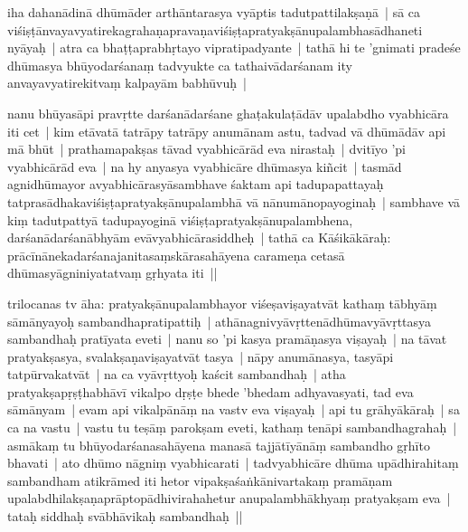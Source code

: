 \documentclass[article,12pt,a4paper]{memoir}%
\newcommand{\persName}[1]{#1}
\newcounter{parCount}
\begin{document}
	  \pstart \leavevmode%
	\label{thakur75-106.4}iha dahanādinā dhūmāder arthāntarasya vyāptis tadutpattilakṣaṇā | sā ca viśiṣṭānvayavyatirekagrahaṇapravaṇaviśiṣṭapratyakṣānupalambhasādhaneti nyāyaḥ | atra ca bhaṭṭaprabhṛtayo vipratipadyante | tathā hi te 'gnimati pradeśe dhūmasya bhūyodarśanaṃ tadvyukte ca tathaivādarśanam ity anvayavyatirekitvaṃ kalpayām babhūvuḥ | 
	{}
	\pend%
      

	  \pstart \leavevmode%
	\label{thakur75-106.8}nanu bhūyasāpi pravṛtte darśanādarśane ghaṭakulaṭādāv upalabdho vyabhicāra iti cet | kim etāvatā tatrāpy tatrāpy anumānam astu, tadvad vā dhūmādāv api mā bhūt | prathamapakṣas tāvad vyabhicārād eva nirastaḥ | dvitīyo 'pi vyabhicārād eva | na hy anyasya vyabhicāre dhūmasya kiñcit | tasmād agnidhūmayor avyabhicārasyāsambhave śaktam api tadupapattayaḥ tatprasādhakaviśiṣṭapratyakṣānupalambhā vā nānumānopayoginaḥ | sambhave vā kiṃ tadutpattyā tadupayoginā viśiṣṭapratyakṣānupalambhena, darśanādarśanābhyām evāvyabhicārasiddheḥ | tathā ca Kāśikākāraḥ: prācīnānekadarśanajanitasaṃskārasahāyena carameṇa cetasā dhūmasyāgniniyatatvaṃ gṛhyata iti ||
	{}
	\pend%
      

	  \pstart \leavevmode%
	\label{thakur75-106.16}\persName{trilocanas} tv āha: pratyakṣānupalambhayor viśeṣaviṣayatvāt kathaṃ tābhyāṃ sāmānyayoḥ sambandhapratipattiḥ | athānagnivyāvṛttenādhūmavyāvṛttasya sambandhaḥ pratīyata eveti | nanu so 'pi kasya pramāṇasya viṣayaḥ | na tāvat pratyakṣasya, svalakṣaṇaviṣayatvāt tasya | nāpy anumānasya, tasyāpi tatpūrvakatvāt | na ca vyāvṛttyoḥ  kaścit sambandhaḥ | atha pratyakṣapṛṣṭhabhāvī vikalpo dṛṣṭe bhede 'bhedam adhyavasyati, tad eva sāmānyam | evam api vikalpānāṃ na vastv eva viṣayaḥ | api tu grāhyākāraḥ | sa ca na vastu | vastu tu teṣāṃ parokṣam eveti, kathaṃ tenāpi sambandhagrahaḥ | asmākaṃ tu bhūyodarśanasahāyena manasā tajjātīyānāṃ sambandho gṛhīto bhavati | ato dhūmo nāgniṃ vyabhicarati | tadvyabhicāre dhūma upādhirahitaṃ sambandham atikrāmed iti hetor vipakṣaśaṅkānivartakaṃ pramāṇam upalabdhilakṣaṇaprāptopādhivirahahetur anupalambhākhyaṃ pratyakṣam eva | tataḥ siddhaḥ svābhāvikaḥ sambandhaḥ ||
	{}
	\pend%
      
\end{document}
